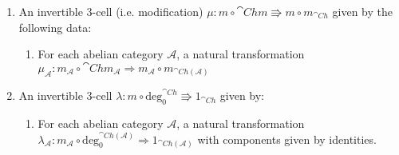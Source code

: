 \begin{enumerate}
\begin{enumerate}
        with differential given by the components:
        \begin{equation*}
            (d_n)_{r,s} := (-1)^sd^h_{r+1,s}+(-1)^{s+1}d^v_{r,s+1}
        \end{equation*}
        For a map $F:A_{\bullet,\bullet}\rightarrow B_{\bullet,\bullet}$, we set 
        \begin{equation*}
            m_\mathcal{A}(F):\text{Tot}_\mathcal{A}(A_{\bullet,\bullet})\rightarrow \text{Tot}_\mathcal{A}(B_{\bullet,\bullet})
        \end{equation*}
        with $n$th component given by $\bigoplus_{i+j=n}F_{i,j}$
        \item For each functor $F:\mathcal{A}\rightarrow \mathcal{B}$ between abelian categories, a natural transformation $m_F:m_\mathcal{B}\circ \cat{Ch}^2(F)\Rightarrow \cat{Ch}(F)\circ m_\mathcal{A}$
        \[\begin{tikzcd}
        	{\cat{Ch}^2(\mathcal{A})} & {\cat{Ch}^2(\mathcal{B})} \\
        	{\cat{Ch}(\mathcal{A})} & {\cat{Ch}(\mathcal{B})}
        	\arrow["{\cat{Ch}^2(F)}", from=1-1, to=1-2]
        	\arrow["{m_\mathcal{B}}", from=1-2, to=2-2]
        	\arrow["{m_\mathcal{A}}"', from=1-1, to=2-1]
        	\arrow["{\cat{Ch}(F)}"', from=2-1, to=2-2]
        \end{tikzcd}\]
        given by \textbf{TBD}
    \end{enumerate}
    \item An invertible 3-cell (i.e. modification) $\mu:m\circ \cat{Ch}m\Rrightarrow m \circ m_{\cat{Ch}}$ given by the following data:
    \begin{enumerate}
        \item For each abelian category $\mathcal{A}$, a natural transformation $\mu_\mathcal{A}:m_\mathcal{A}\circ \cat{Ch}m_\mathcal{A}\Rightarrow m_\mathcal{A}\circ m_{\cat{Ch}(\mathcal{A})}$
    \end{enumerate}
    \item An invertible 3-cell $\lambda:m\circ \text{deg}_0^{\cat{Ch}}\Rrightarrow 1_{\cat{Ch}}$ given by:
    \begin{enumerate}
        \item For each abelian category $\mathcal{A}$, a natural transformation $\lambda_\mathcal{A}:m_\mathcal{A}\circ \text{deg}_0^{\cat{Ch}(\mathcal{A})}\Rightarrow 1_{\cat{Ch}(\mathcal{A})}$ with components given by identities.
    \end{enumerate}

\end{enumerate}
